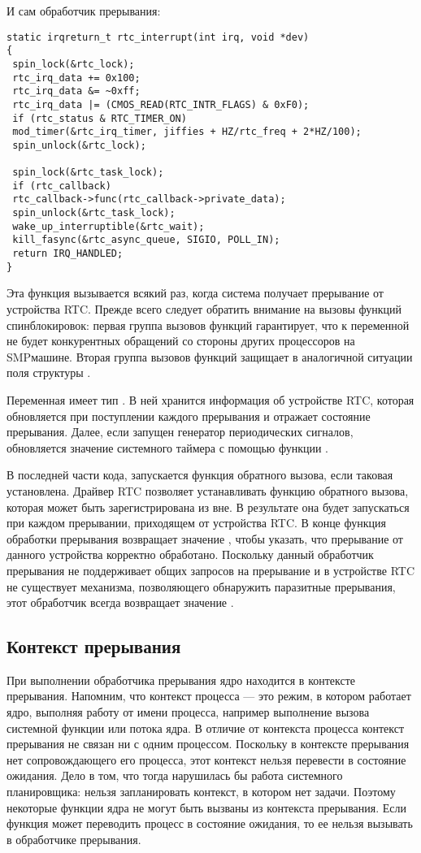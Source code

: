 И сам обработчик прерывания:
\begin{lstlisting}
static irqreturn_t rtc_interrupt(int irq, void *dev)
{
 spin_lock(&rtc_lock);
 rtc_irq_data += 0x100;
 rtc_irq_data &= ~0xff;
 rtc_irq_data |= (CMOS_READ(RTC_INTR_FLAGS) & 0xF0);
 if (rtc_status & RTC_TIMER_ON)
 mod_timer(&rtc_irq_timer, jiffies + HZ/rtc_freq + 2*HZ/100);
 spin_unlock(&rtc_lock);

 spin_lock(&rtc_task_lock);
 if (rtc_callback)
 rtc_callback->func(rtc_callback->private_data);
 spin_unlock(&rtc_task_lock);
 wake_up_interruptible(&rtc_wait);
 kill_fasync(&rtc_async_queue, SIGIO, POLL_IN);
 return IRQ_HANDLED;
}
\end{lstlisting}

Эта функция вызывается всякий раз, когда система получает прерывание от устройства RTC. Прежде всего следует обратить внимание на вызовы функций спинблокировок: первая группа вызовов функций гарантирует, что к переменной  не будет конкурентных обращений со стороны других процессоров на SMPмашине. Вторая группа вызовов функций защищает в аналогичной ситуации поля структуры .

Переменная  имеет тип . В ней хранится информация
об устройстве RTC, которая обновляется при поступлении каждого прерывания и отражает состояние прерывания.
Далее, если запущен генератор периодических сигналов, обновляется значение системного таймера с помощью функции .

В последней части кода, запускается функция обратного вызова, если таковая установлена. Драйвер RTC позволяет устанавливать функцию обратного вызова, которая может быть зарегистрирована из вне. В результате она будет запускаться при каждом прерывании, приходящем от устройства RTC.
В конце функция обработки прерывания возвращает значение , чтобы
указать, что прерывание от данного устройства корректно обработано. Поскольку данный обработчик прерывания не поддерживает общих запросов на прерывание и в устройстве RTC не существует механизма, позволяющего обнаружить паразитные прерывания, этот обработчик всегда возвращает значение .

\subsection{Контекст прерывания}
При выполнении обработчика прерывания ядро находится в контексте прерывания.
Напомним, что контекст процесса — это режим, в котором работает ядро, выполняя работу от имени процесса, например выполнение вызова системной функции или потока ядра.
В отличие от контекста процесса контекст прерывания не связан ни с одним процессом. Поскольку в контексте прерывания нет сопровождающего его процесса, этот контекст нельзя перевести в состояние ожидания. Дело в том, что тогда нарушилась бы работа системного планировщика: нельзя запланировать контекст, в котором нет задачи. Поэтому некоторые функции ядра не могут быть вызваны из контекста прерывания. Если функция может переводить процесс
в состояние ожидания, то ее нельзя вызывать в обработчике прерывания.

